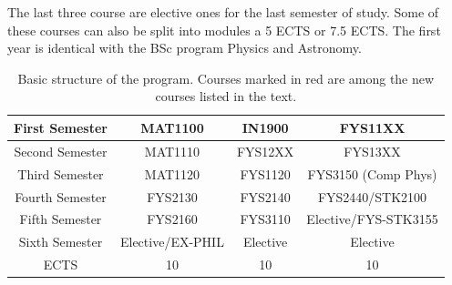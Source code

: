 \documentclass[aps,rmp,preprint,amsmath,amssymb,graphicx,longbibliography]{revtex4-1}
\begin{document}
The last three course are elective ones for the last semester of study. Some of these courses can also be split into modules a 5 ECTS or 7.5 ECTS.
The first year is identical with the BSc program Physics and Astronomy.

\begin{table}
 \caption{Basic structure of the program. Courses marked in red are among the new courses listed in the text.}
    \centering
    \begin{tabular}{|c|c|c|c|} \hline
    First Semester & MAT1100 &  IN1900   & FYS11XX  \\ \hline 
    Second Semester & MAT1110 & FYS12XX  & FYS13XX \\ \hline
    Third Semester & MAT1120 &   FYS1120  &  FYS3150 (Comp Phys)\\ \hline
    Fourth Semester & FYS2130 & FYS2140    & \color{red} {FYS2440}/STK2100 \\ \hline       
    Fifth Semester & FYS2160 & FYS3110     & \color{red}Elective/FYS-STK3155 \\ \hline
    Sixth Semester & \color{red} Elective/EX-PHIL & \color{red} Elective    & \color{red} Elective \\ \hline
   ECTS & 10 &  10   &  10  \\ \hline    
    \end{tabular}
\end{table}



\end{document}
